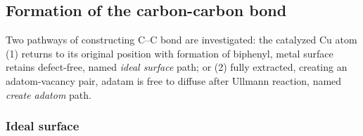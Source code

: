 \documentclass[%
 reprint,
 amsmath,amssymb,
 aps,
prb,
floatfix,
]{revtex4-2}
\newcommand{\lock}{\color{red}}
\newcommand{\zhzh}{\color{blue}}
\newcommand{\lock}{\color{red}}
\newcommand{\zhzh}{\color{blue}}
\newcommand{\comm}{\color{Purple}} %
\begin{document}

\subsection{Formation of the carbon-carbon bond}


{\zhzh
Two pathways of constructing C--C bond are investigated: the catalyzed Cu atom (1) returns to its original position with formation of biphenyl, metal surface retains defect-free, named \textit{ideal surface} path; or (2) fully extracted, creating an adatom-vacancy pair, adatam is free to diffuse after Ullmann reaction, named \textit{create adatom} path. 
}

\subsubsection{Ideal surface}



\end{document}
